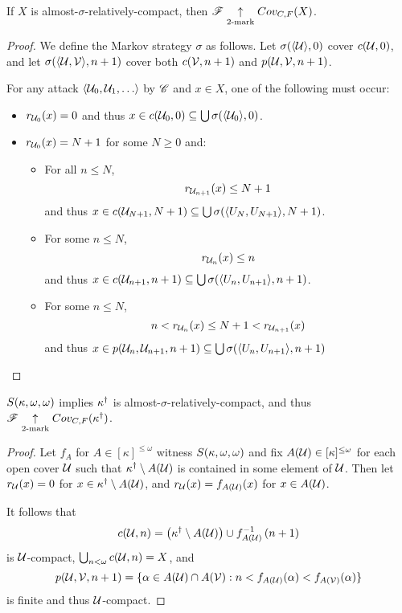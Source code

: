 \begin{thm}
  If $X$ is almost-$\sigma$-relatively-compact, then
  $\mathscr{F}\underset{2\text{-mark}}{\uparrow}Cov_{C,F}(X)$.
\end{thm}

\begin{proof}
  We define the Markov strategy $\sigma$ as follows.
  Let $\sigma(\langle\mathcal{U}\rangle,0)$ cover $c(\mathcal{U},0)$, and let
  $\sigma(\langle\mathcal{U},\mathcal{V}\rangle,n+1)$ cover both $c(\mathcal{V},n+1)$ and
  $p(\mathcal{U}, \mathcal{V},n+1)$.

  For any attack $\<\mc{U}_0,\mc{U}_1,\dots\>$ by $\mathscr{C}$ and $x\in X$,
  one of the following must occur:

  \begin{itemize}
    \item
      $r_{\mathcal{U}_0}(x)=0$ and thus
      $x\in c(\mathcal{U}_0,0)\subseteq \bigcup \sigma(\langle\mathcal{U}_0\rangle,0)$.

    \item
      $r_{\mathcal{U}_0}(x)=N+1$ for some $N\geq 0$ and:
      \begin{itemize}
        \item
          For all $n\leq N$,
          \[
            r_{\mathcal{U}_{n+1}}(x)\leq N+1
          \]
          and thus
          $x\in c(\mathcal{U}_{N+1},N+1) \subseteq
            \bigcup \sigma(\langle U_N,U_{N+1}\rangle,N+1)$.
        \item
          For some $n \leq N$,
          \[ r_{\mathcal{U}_n}(x)\leq n \]
          and thus
          $x\in c(\mathcal{U}_{n+1},n+1) \subseteq
            \bigcup \sigma(\langle U_n,U_{n+1}\rangle,n+1)$.
        \item
          For some $n \leq N$,
          \[
            n < r_{\mathcal{U}_n}(x)\leq N+1 < r_{\mathcal{U}_{n+1}}(x)
          \]
         and thus
         $x\in p(\mathcal{U}_n,\mathcal{U}_{n+1},n+1) \subseteq
          \bigcup \sigma(\langle U_n,U_{n+1}\rangle,n+1)$
       \end{itemize}
  \end{itemize}
\end{proof}

\begin{thm}
  $S(\kappa,\omega,\omega)$ implies $\kappa^\dagger$ is
  almost-$\sigma$-relatively-compact, and thus
  $\mathscr{F}\underset{2\text{-mark}}{\uparrow}Cov_{C,F}(\kappa^\dagger)$.
\end{thm}

\begin{proof}
  Let $f_A$ for $A\in[\kappa]^{\leq\omega}$ witness $S(\kappa,\omega,\omega)$ and fix
  $A(\mathcal{U})\in[\kappa]^{\leq\omega}$ for each open cover $\mathcal{U}$ such that
  $\kappa^\dagger\setminus A(\mathcal{U})$ is contained in some element of
  $\mathcal{U}$.
  Then let $r_{\mathcal{U}}(x)=0$ for $x\in\kappa^\dagger\setminus A(\mathcal{U})$,
  and $r_{\mathcal{U}}(x)=f_{A(\mathcal{U})}(x)$ for $x\in A(\mathcal{U})$.

  It follows that
    \[
      c(\mathcal{U},n)
        =
      \left(\kappa^\dagger\setminus A(\mathcal{U})\right)
        \cup
      f_{A(\mathcal{U})}^{-1}\left(n+1\right)
    \]
  is $\mathcal{U}$-compact, $\bigcup_{n<\omega}c(\mathcal{U},n)=X$, and
    \[
      p(\mathcal{U},\mathcal{V},n+1)
        =
      \{
        \alpha\in A(\mathcal{U})\cap A(\mathcal{V})
          :
        n < f_{A(\mathcal{U})}(\alpha) < f_{A(\mathcal{V})}(\alpha)
      \}
    \]
  is finite and thus $\mathcal{U}$-compact.
\end{proof}

